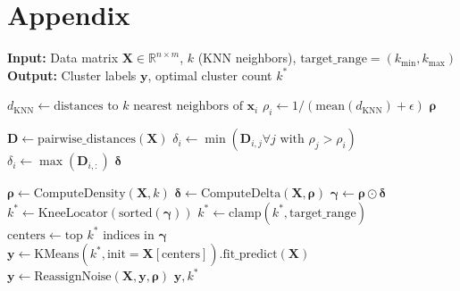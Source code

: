 \documentclass{article}
\begin{document}
\section*{Appendix}
\begin{algorithm}
\caption{Improved Density Peaks Clustering (DPC)}
\label{alg:dpc}
\begin{algorithmic}[1]
\State \textbf{Input:} 
    Data matrix $\mathbf{X} \in \mathbb{R}^{n \times m}$,
    $k$ (KNN neighbors),
    $\text{target\_range} = (k_{\min}, k_{\max})$
\State \textbf{Output:} 
    Cluster labels $\mathbf{y}$, optimal cluster count $k^*$

        \State $d_{\text{KNN}} \gets \text{distances to } k \text{ nearest neighbors of } \mathbf{x}_i$
        \State $\rho_i \gets 1 / (\text{mean}(d_{\text{KNN}}) + \epsilon)$ 
    \EndFor
    \Return $\boldsymbol{\rho}$
\EndProcedure

    \State $\mathbf{D} \gets \text{pairwise\_distances}(\mathbf{X})$
            \State $\delta_i \gets \min(\mathbf{D}_{i,j} \forall j \text{ with } \rho_j > \rho_i)$
        \Else
            \State $\delta_i \gets \max(\mathbf{D}_{i,:})$ 
        \EndIf
    \EndFor
    \Return $\boldsymbol{\delta}$
\EndProcedure

    \State $\boldsymbol{\rho} \gets \text{ComputeDensity}(\mathbf{X}, k)$
    \State $\boldsymbol{\delta} \gets \text{ComputeDelta}(\mathbf{X}, \boldsymbol{\rho})$
    \State $\boldsymbol{\gamma} \gets \boldsymbol{\rho} \odot \boldsymbol{\delta}$ 
    \State $k^* \gets \text{KneeLocator}(\text{sorted}(\boldsymbol{\gamma}))$
    \State $k^* \gets \text{clamp}(k^*, \text{target\_range})$
    \State $\text{centers} \gets \text{top } k^* \text{ indices in } \boldsymbol{\gamma}$
    \State $\mathbf{y} \gets \text{KMeans}(k^*, \text{init}=\mathbf{X}[\text{centers}]).\text{fit\_predict}(\mathbf{X})$
    \State $\mathbf{y} \gets \text{ReassignNoise}(\mathbf{X}, \mathbf{y}, \boldsymbol{\rho})$
    \State \Return $\mathbf{y}, k^*$
\EndProcedure
\end{algorithmic}
\end{algorithm}
\end{document}
